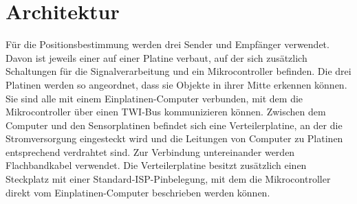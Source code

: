 \section{Architektur} %
Für die Positionsbestimmung werden drei Sender und Empfänger verwendet. Davon ist jeweils einer auf einer Platine verbaut, auf der sich zusätzlich Schaltungen für die Signalverarbeitung und ein Mikrocontroller befinden. Die drei Platinen werden so angeordnet, dass sie Objekte in ihrer Mitte erkennen können. Sie sind alle mit einem Einplatinen-Computer verbunden, mit dem die Mikrocontroller über einen \ac{TWI}-Bus kommunizieren können. Zwischen dem Computer und den Sensorplatinen befindet sich eine Verteilerplatine, an der die Stromversorgung eingesteckt wird und die Leitungen von Computer zu Platinen entsprechend verdrahtet sind. %
Zur Verbindung untereinander werden Flachbandkabel verwendet. Die Verteilerplatine besitzt zusätzlich einen Steckplatz mit einer Standard-\ac{ISP}-Pinbelegung, mit dem die Mikrocontroller direkt vom Einplatinen-Computer beschrieben werden können.\\
